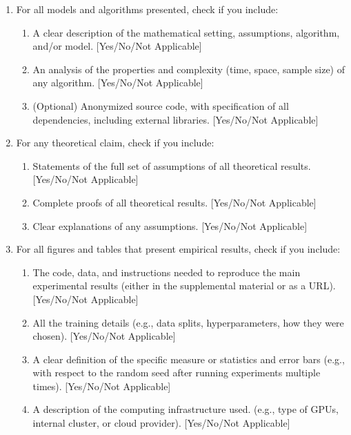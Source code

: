 \documentclass[twoside]{article}
\theoremstyle{definition}
\begin{document}
 \begin{enumerate}


 \item For all models and algorithms presented, check if you include:
 \begin{enumerate}
   \item A clear description of the mathematical setting, assumptions, algorithm, and/or model. [Yes/No/Not Applicable]
   \item An analysis of the properties and complexity (time, space, sample size) of any algorithm. [Yes/No/Not Applicable]
   \item (Optional) Anonymized source code, with specification of all dependencies, including external libraries. [Yes/No/Not Applicable]
 \end{enumerate}


 \item For any theoretical claim, check if you include:
 \begin{enumerate}
   \item Statements of the full set of assumptions of all theoretical results. [Yes/No/Not Applicable]
   \item Complete proofs of all theoretical results. [Yes/No/Not Applicable]
   \item Clear explanations of any assumptions. [Yes/No/Not Applicable]     
 \end{enumerate}


 \item For all figures and tables that present empirical results, check if you include:
 \begin{enumerate}
   \item The code, data, and instructions needed to reproduce the main experimental results (either in the supplemental material or as a URL). [Yes/No/Not Applicable]
   \item All the training details (e.g., data splits, hyperparameters, how they were chosen). [Yes/No/Not Applicable]
         \item A clear definition of the specific measure or statistics and error bars (e.g., with respect to the random seed after running experiments multiple times). [Yes/No/Not Applicable]
         \item A description of the computing infrastructure used. (e.g., type of GPUs, internal cluster, or cloud provider). [Yes/No/Not Applicable]
 \end{enumerate}


\end{enumerate}
\end{document}
